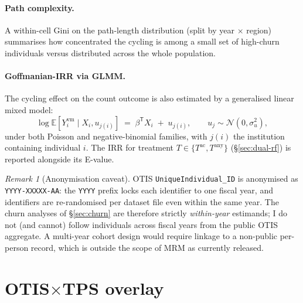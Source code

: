 \documentclass[11pt,a4paper]{article}
\theoremstyle{plain}
\theoremstyle{definition}
\theoremstyle{remark}
\newtheorem{remark}[theorem]{Remark}
\newcommand{\E}{\mathbb{E}}
\newcommand{\T}{\mathsf{T}}
\begin{document}
\paragraph{Path complexity.}
A within-cell Gini on the path-length distribution
(split by year $\times$ region) summarises how concentrated the
cycling is among a small set of high-churn individuals versus
distributed across the whole population.

\paragraph{Goffmanian-IRR via GLMM.}
The cycling effect on the count outcome is also estimated by a
generalised linear mixed model:
\begin{equation}
  \log \E[Y_{i}^{\mathrm{vm}} \mid X_{i}, u_{j(i)}]
  \;=\; \beta^{\T} X_{i} \;+\; u_{j(i)},
  \qquad u_{j} \sim \mathcal{N}(0, \sigma_{u}^{2}),
  \label{eq:churn-glmm}
\end{equation}
under both Poisson and negative-binomial families, with
$j(i)$ the institution containing individual $i$. The IRR for
treatment $T \in \{T^{\mathrm{ac}}, T^{\mathrm{any}}\}$
(\S\ref{sec:dual-rf}) is reported alongside its E-value.

\begin{remark}[Anonymisation caveat]
\label{rmk:churn-anon}
OTIS \texttt{UniqueIndividual\_ID} is anonymised as
\texttt{YYYY-XXXXX-AA}: the \texttt{YYYY} prefix locks each
identifier to one fiscal year, and identifiers are re-randomised
per dataset file even within the same year. The
churn analyses of \S\ref{sec:churn} are therefore strictly
\emph{within-year} estimands; I do not (and cannot) follow
individuals across fiscal years from the public OTIS aggregate.
A multi-year cohort design would require linkage to a
non-public per-person record, which is outside the scope of
MRM as currently released.
\end{remark}

\section{OTIS$\times$TPS overlay}
\label{sec:overlay}
\end{document}
